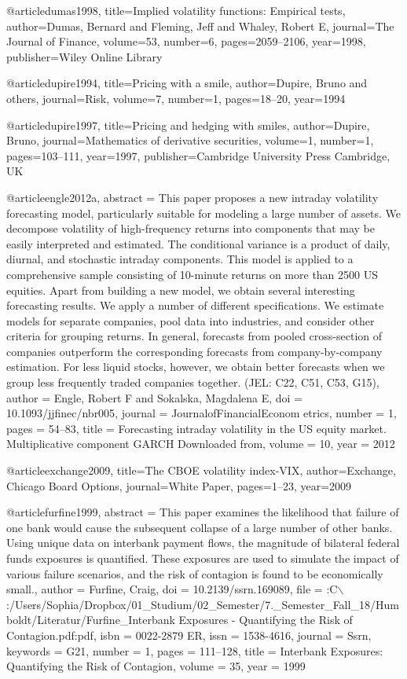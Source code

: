 @article{dumas1998,
  title={Implied volatility functions: Empirical tests},
  author={Dumas, Bernard and Fleming, Jeff and Whaley, Robert E},
  journal={The Journal of Finance},
  volume={53},
  number={6},
  pages={2059--2106},
  year={1998},
  publisher={Wiley Online Library}
}

@article{dupire1994,
  title={Pricing with a smile},
  author={Dupire, Bruno and others},
  journal={Risk},
  volume={7},
  number={1},
  pages={18--20},
  year={1994}
}

@article{dupire1997,
  title={Pricing and hedging with smiles},
  author={Dupire, Bruno},
  journal={Mathematics of derivative securities},
  volume={1},
  number={1},
  pages={103--111},
  year={1997},
  publisher={Cambridge University Press Cambridge, UK}
}

@article{engle2012a,
abstract = {This paper proposes a new intraday volatility forecasting model, particularly suitable for modeling a large number of assets. We decompose volatility of high-frequency returns into components that may be easily interpreted and estimated. The conditional variance is a product of daily, diurnal, and stochastic intraday components. This model is applied to a comprehensive sample consisting of 10-minute returns on more than 2500 US equities. Apart from building a new model, we obtain several interesting forecasting results. We apply a number of different specifications. We estimate models for separate companies, pool data into industries, and consider other criteria for grouping returns. In general, forecasts from pooled cross-section of companies outperform the corresponding forecasts from company-by-company estimation. For less liquid stocks, however, we obtain better forecasts when we group less frequently traded companies together. (JEL: C22, C51, C53, G15)},
author = {Engle, Robert F and Sokalska, Magdalena E},
doi = {10.1093/jjfinec/nbr005},
journal = {JournalofFinancialEconom etrics},
number = {1},
pages = {54--83},
title = {{Forecasting intraday volatility in the US equity market. Multiplicative component GARCH Downloaded from}},
volume = {10},
year = {2012}
}

@article{exchange2009,
  title={The CBOE volatility index-VIX},
  author={Exchange, Chicago Board Options},
  journal={White Paper},
  pages={1--23},
  year={2009}
}


@article{furfine1999,
abstract = {This paper examines the likelihood that failure of one bank would cause the subsequent collapse of a large number of other banks.  Using unique data on interbank payment flows, the magnitude of bilateral federal funds exposures is quantified.  These exposures are used to simulate the impact of various failure scenarios, and the risk of contagion is found to be economically small.},
author = {Furfine, Craig},
doi = {10.2139/ssrn.169089},
file = {:C$\backslash$:/Users/Sophia/Dropbox/01{\_}Studium/02{\_}Semester/7.{\_}Semester{\_}Fall{\_}18/Humboldt/Literatur/Furfine{\_}Interbank Exposures - Quantifying the Risk of Contagion.pdf:pdf},
isbn = {0022-2879 ER},
issn = {1538-4616},
journal = {Ssrn},
keywords = {G21},
number = {1},
pages = {111--128},
title = {{Interbank Exposures: Quantifying the Risk of Contagion}},
volume = {35},
year = {1999}
}

